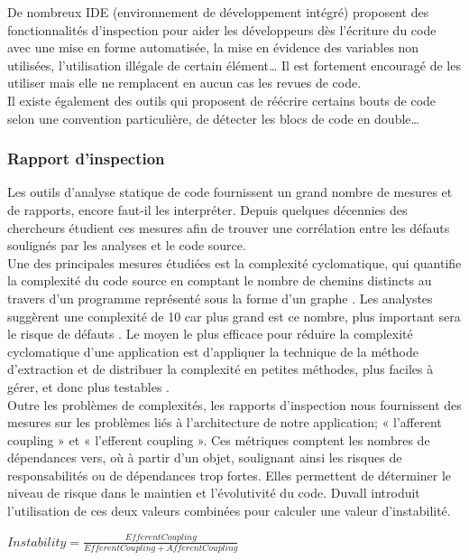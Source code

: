     De nombreux IDE (environnement de développement intégré) proposent des fonctionnalités d’inspection pour aider les développeurs dès l’écriture du code avec une mise en forme automatisée, la mise en évidence des variables non utilisées, l’utilisation illégale de certain élément… Il est fortement encouragé de les utiliser mais elle ne remplacent en aucun cas les revues de code.\\

    Il existe également des outils qui proposent de réécrire certains bouts de code selon une convention particulière, de détecter les blocs de code en double…

      \subsubsection{Rapport d’inspection}
      Les outils d’analyse statique de code fournissent un grand nombre de mesures et de rapports, encore faut-il les interpréter. Depuis quelques décennies des chercheurs étudient ces mesures afin de trouver une corrélation entre les défauts soulignés par les analyses et le code source.\\

      Une des principales mesures étudiées est la complexité cyclomatique, qui quantifie la complexité du code source en comptant le nombre de chemins distincts au travers d'un programme représenté sous la forme d'un graphe \cite{Kan03}. Les analystes suggèrent une complexité de 10 car plus grand est ce nombre, plus important sera le risque de défauts \cite{Wat96}. Le moyen le plus efficace pour réduire la complexité cyclomatique d’une application est d'appliquer la technique de la méthode d'extraction et de distribuer la complexité en petites méthodes, plus faciles à gérer, et donc plus testables \cite{Duv07}.\\

      Outre les problèmes de complexités, les rapports d’inspection nous fournissent des mesures sur les problèmes liés à l’architecture de notre application; « l’afferent coupling » et « l’efferent coupling ». Ces métriques comptent les nombres de dépendances vers, où à partir d’un objet, soulignant ainsi les risques de responsabilités ou de dépendances trop fortes. Elles permettent de déterminer le niveau de risque dans le maintien et l’évolutivité du code. Duvall introduit l'utilisation de ces deux valeurs combinées pour calculer une valeur d'instabilité.\\

      \begin{center}
          $Instability=\frac{EfferentCoupling}{EfferentCoupling + AfferentCoupling}$\\
      \end{center}

